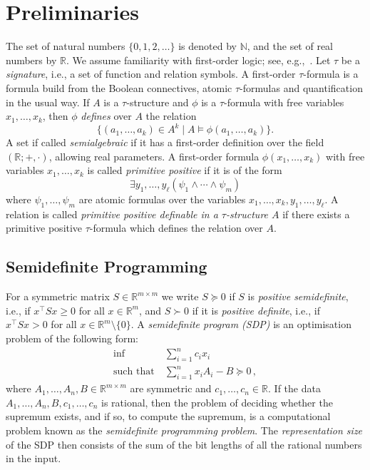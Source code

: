 \documentclass[11pt]{article}
\theoremstyle{definition}
\theoremstyle{remark}
\begin{document}
\section{Preliminaries}
The set of natural numbers 
 $\{0,1,2,\dots\}$ is denoted by 
${\mathbb N}$, and the set of real numbers by ${\mathbb R}$. 
We assume familiarity with first-order logic; see, e.g.,~\cite{Hodges}. 
Let $\tau$ be a \emph{signature}, i.e., a set of function and relation symbols. A first-order $\tau$-formula
is a formula build from the Boolean connectives, atomic $\tau$-formulas and quantification in the usual way.
If $A$ is a $\tau$-structure and $\phi$ is a $\tau$-formula with free variables $x_1,\dots,x_k$, then 
$\phi$ \emph{defines} over $A$ the relation
$$\{(a_1,\dots,a_k) \in A^k \mid A \models \phi(a_1,\dots,a_k)\}.$$
A set if called \emph{semialgebraic} if it has a first-order definition over the field $({\mathbb R};+,\cdot)$, allowing real parameters. A first-order formula $\phi(x_1,\dots,x_k)$ with free variables $x_1,\dots,x_k$ is called \emph{primitive positive} if it is of the form $$\exists y_1,\dots,y_{\ell} (\psi_1 \wedge \cdots \wedge \psi_m)$$
where $\psi_1,\dots,\psi_m$ are atomic formulas over the variables $x_1,\dots,x_k,y_1,\dots,y_{\ell}$. 
A relation is called \emph{primitive positive definable in a $\tau$-structure $A$} if there exists a primitive positive $\tau$-formula which defines the relation over $A$. 


\subsection{Semidefinite Programming}
For a symmetric matrix $S \in {\mathbb R}^{m \times m}$ we write $S \succeq 0$ if $S$ is \emph{positive semidefinite}, i.e., if 
$x^{\top} S x \geq 0$ for all $x \in {\mathbb R}^m$,
and $S \succ 0$ if it is \emph{positive definite}, i.e., if 
$x^{\top} S x > 0$ for all $x \in {\mathbb R}^m \setminus \{0\}$. 
A \emph{semidefinite program (SDP)} is an optimisation problem of the following form:
\begin{equation}\label{eq:P}\tag{P}
\begin{aligned}
    \inf \ &\sum_{i=1}^n c_i x_i \nonumber \\ 
     \text{such that} \ &\sum_{i=1}^n x_i A_i - B \succeq 0 \, , 
\end{aligned}
\end{equation}
where $A_1,\dots,A_n,B \in {\mathbb R}^{m \times m}$ are symmetric and $c_1,\dots,c_n \in {\mathbb R}$. If the data $A_1,\dots,A_n,B,c_1,\dots,c_n$ is rational, then the problem of deciding whether the supremum exists, and if so, to compute the supremum, is a computational problem known as the \emph{semidefinite programming problem}. The \emph{representation size} of the SDP then consists of the sum of the bit lengths of all the rational numbers in the input. 
\end{document}
